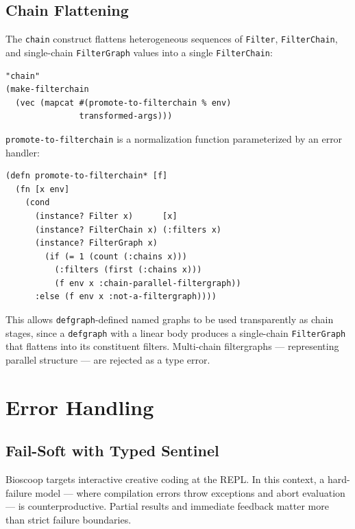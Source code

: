 \documentclass[conference]{IEEEtran}
\begin{document}
\subsection{Chain Flattening}

The \texttt{chain} construct flattens heterogeneous sequences of \texttt{Filter}, \texttt{FilterChain}, and single-chain \texttt{FilterGraph} values into a single \texttt{FilterChain}:

\begin{lstlisting}[caption={chain flattening via promote-to-filterchain}]
"chain"
(make-filterchain
  (vec (mapcat #(promote-to-filterchain % env)
               transformed-args)))
\end{lstlisting}

\texttt{promote-to-filterchain} is a normalization function parameterized by an error handler:

\begin{lstlisting}[caption={promote-to-filterchain* factory}]
(defn promote-to-filterchain* [f]
  (fn [x env]
    (cond
      (instance? Filter x)      [x]
      (instance? FilterChain x) (:filters x)
      (instance? FilterGraph x)
        (if (= 1 (count (:chains x)))
          (:filters (first (:chains x)))
          (f env x :chain-parallel-filtergraph))
      :else (f env x :not-a-filtergraph))))
\end{lstlisting}

This allows \texttt{defgraph}-defined named graphs to be used transparently as chain stages, since a \texttt{defgraph} with a linear body produces a single-chain \texttt{FilterGraph} that flattens into its constituent filters. Multi-chain filtergraphs --- representing parallel structure --- are rejected as a type error.

\section{Error Handling}

\subsection{Fail-Soft with Typed Sentinel}

Bioscoop targets interactive creative coding at the REPL. In this context, a hard-failure model --- where compilation errors throw exceptions and abort evaluation --- is counterproductive. Partial results and immediate feedback matter more than strict failure boundaries.
\end{document}
